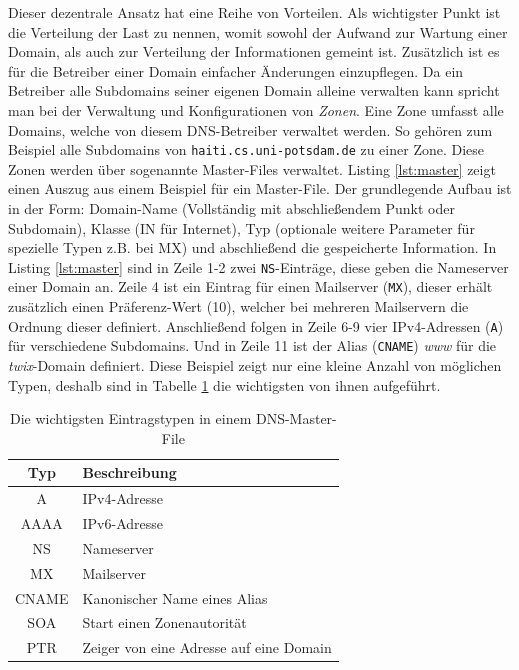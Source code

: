 \documentclass[a4paper, 12pt, BCOR10mm, DIV12, toc=bibliography, toc=listof, german]{scrbook}
\begin{document}
			

			Dieser dezentrale Ansatz hat eine Reihe von Vorteilen. Als wichtigster Punkt ist die
			Verteilung der Last zu nennen, womit sowohl der Aufwand zur Wartung einer Domain, als auch zur
			Verteilung der Informationen gemeint ist. Zusätzlich ist es für die Betreiber einer Domain
			einfacher Änderungen einzupflegen. Da ein Betreiber alle Subdomains seiner eigenen Domain
			alleine verwalten kann spricht man bei der Verwaltung und Konfigurationen von \textit{Zonen}.
			Eine Zone umfasst alle Domains, welche von diesem DNS-Betreiber verwaltet werden. So gehören
			zum Beispiel alle Subdomains von \texttt{haiti.cs.uni-potsdam.de} zu einer Zone. Diese Zonen
			werden über sogenannte Master-Files \cite{rfc1035,liualb2006} verwaltet. Listing
			\ref{lst:master} zeigt einen Auszug aus einem Beispiel für ein Master-File. Der grundlegende
			Aufbau ist in der Form: Domain-Name (Vollständig mit abschließendem Punkt oder Subdomain),
			Klasse (IN für Internet), Typ (optionale weitere Parameter für spezielle Typen z.B. bei MX)
			und abschließend die gespeicherte Information. In Listing \ref{lst:master} sind in Zeile 1-2
			zwei \texttt{NS}-Einträge, diese geben die Nameserver einer Domain an. Zeile 4 ist ein Eintrag
			für einen Mailserver (\texttt{MX}), dieser erhält zusätzlich einen Präferenz-Wert (10),
			welcher bei mehreren Mailservern die Ordnung dieser definiert. Anschließend folgen in Zeile
			6-9 vier IPv4-Adressen (\texttt{A}) für verschiedene Subdomains. Und in Zeile 11 ist der Alias
			(\texttt{CNAME}) \textit{www} für die  \textit{twix}-Domain definiert. Diese Beispiel zeigt
			nur eine kleine Anzahl von möglichen Typen, deshalb sind in Tabelle \ref{tab:dns-types} die
			wichtigsten von ihnen aufgeführt.

			\begin{table}
				\centering
				\begin{tabular}{|c|l|}\hline
					Typ & Beschreibung \\\hline\hline
					A	& IPv4-Adresse\\
					AAAA	& IPv6-Adresse\\
					NS	& Nameserver\\
					MX	& Mailserver\\
					CNAME	& Kanonischer Name eines Alias\\
					SOA	& Start einen Zonenautorität\\
					PTR		& Zeiger von eine Adresse auf eine Domain\\\hline
				\end{tabular}
			\caption{Die wichtigsten Eintragstypen in einem DNS-Master-File \cite{rfc1035,rfc3596}}
			\label{tab:dns-types}
			\end{table}
\end{document}
